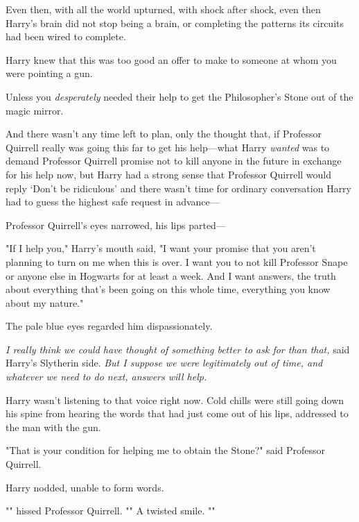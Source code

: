 Even then, with all the world upturned, with shock after shock, even then 
Harry's brain did not stop being a brain, or completing the patterns its 
circuits had been wired to complete.

Harry knew that this was too good an offer to make to someone at whom you were 
pointing a gun.

Unless you \emph{desperately} needed their help to get the Philosopher's Stone 
out of the magic mirror.

And there wasn't any time left to plan, only the thought that, if Professor 
Quirrell really was going this far to get his help---what Harry \emph{wanted} 
was to demand Professor Quirrell promise not to kill anyone in the future in 
exchange for his help now, but Harry had a strong sense that Professor Quirrell 
would reply `Don't be ridiculous' and there wasn't time for ordinary 
conversation Harry had to guess the highest safe request in advance---

Professor Quirrell's eyes narrowed, his lips parted---

"If I help you," Harry's mouth said, "I want your promise that you aren't 
planning to turn on me when this is over. I want you to not kill Professor 
Snape or anyone else in Hogwarts for at least a week. And I want answers, the 
truth about everything that's been going on this whole time, everything you 
know about my nature."

The pale blue eyes regarded him dispassionately.

\emph{I really think we could have thought of something better to ask for than 
that,} said Harry's Slytherin side. \emph{But I suppose we were legitimately 
out of time, and whatever we need to do next, answers will help.}

Harry wasn't listening to that voice right now. Cold chills were still going 
down his spine from hearing the words that had just come out of his lips, 
addressed to the man with the gun.

"That is your condition for helping me to obtain the Stone?" said Professor 
Quirrell.

Harry nodded, unable to form words.

"" hissed Professor Quirrell. "" A twisted smile. 
""

